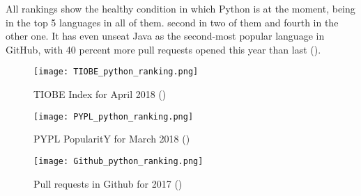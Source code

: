 All rankings show the healthy condition in which Python is at the moment, being in the top 5 languages in all of them. second in two of them and fourth in the other one. It has even unseat Java as the second-most popular language in GitHub, with 40 percent more pull requests opened this year than last (\cite{octoverse_2017}). 

\begin{figure}[h!b]
	\centering
	\texttt{[image: TIOBE\_python\_ranking.png]}
	\caption{TIOBE Index for April 2018 (\cite{tiobe_index})}
	\label{fig:tiobe_rank}
\end{figure}

\begin{figure}[h!b]
	\centering
	\texttt{[image: PYPL\_python\_ranking.png]}
	\caption{PYPL PopularitY for March 2018 (\cite{pypl_pop_rank})}
	\label{fig:pypl_rank}
\end{figure}

\begin{figure}[h!b]
	\centering
	\texttt{[image: Github\_python\_ranking.png]}
	\caption{Pull requests in Github for 2017 (\cite{octoverse_2017})}
	\label{fig:github_octoverse_rank}
\end{figure}